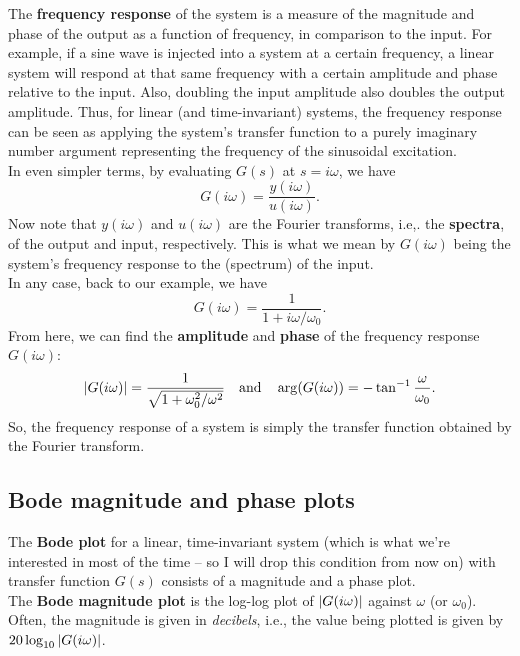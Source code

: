 \documentclass{book}
\theoremstyle{definition}
\newcommand{\f}[2]{\frac{#1}{#2}}
\begin{document}
The \textbf{frequency response} of the system is a measure of the magnitude and phase of the output as a function of frequency, in comparison to the input. For example, if a sine wave is injected into a system at a certain frequency, a linear system will respond at that same frequency with a certain amplitude and phase relative to the input. Also, doubling the input amplitude also doubles the output amplitude. Thus, for linear (and time-invariant) systems, the frequency response can be seen as applying the system's transfer function to a purely imaginary number argument representing the frequency of the sinusoidal excitation. \\

In even simpler terms, by evaluating $G(s)$ at $s = i\omega$,  we have
\begin{equation*}
G(i\omega) = \f{y(i\omega)}{u(i\omega)}.
\end{equation*}
Now note that $y(i\omega)$ and $u(i\omega)$ are the Fourier transforms, i.e,. the \textbf{spectra}, of the output and input, respectively. This is what we mean by $G(i\omega)$ being the system's frequency response to the (spectrum) of the input. \\


In any case, back to our example, we have
\begin{equation*}
G(i\omega) = \f{1}{1 + i\omega/\omega_0}. 
\end{equation*}
From here, we can find the \textbf{amplitude} and \textbf{phase} of the frequency response $G(i\omega)$:
\begin{equation*}
\abs{G(i\omega)} = \f{1}{\sqrt{1+ \omega_0^2/\omega^2}} \quad \text{and} \quad \arg(G(i\omega)) = -\tan^{-1} \f{\omega}{\omega_0}.
\end{equation*}
So, the frequency response of a system is simply the transfer function obtained by the Fourier transform. 



\subsection*{Bode magnitude and phase plots}

The \textbf{Bode plot} for a linear, time-invariant system (which is what we're interested in most of the time -- so I will drop this condition from now on) with transfer function $G(s)$ consists of a magnitude and a phase plot.\\


The \textbf{Bode magnitude plot} is the log-log plot of $\abs{G(i\omega)}$ against $\omega$ (or $\omega_0$). Often, the magnitude is given in \textit{decibels}, i.e., the value being plotted is given by $20 \log_{10} \abs{G(i\omega)}$.  
\end{document}
